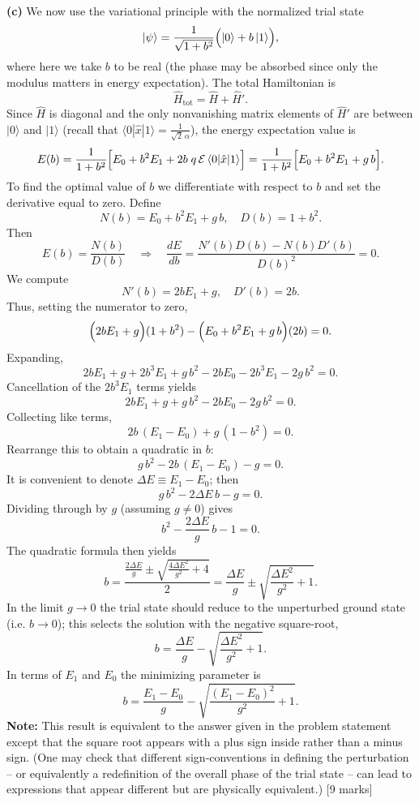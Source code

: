 \documentclass{article}
\begin{document}
\textbf{(c)} We now use the variational principle with the normalized trial state
\[
|\psi\rangle = \frac{1}{\sqrt{1+b^2}}\Bigl(|0\rangle + b\,|1\rangle\Bigr),
\]
where here we take \(b\) to be real (the phase may be absorbed since only the modulus matters in energy expectation). The total Hamiltonian is
\[
\hat{H}_{\text{tot}} = \hat{H} + \hat{H}'.
\]
Since \(\hat{H}\) is diagonal and the only nonvanishing matrix elements of \(\hat{H}'\) are between \(|0\rangle\) and \(|1\rangle\) (recall that
\(\langle 0|\hat{x}|1\rangle = \frac{1}{\sqrt{2}\,\alpha}\)),
the energy expectation value is
\[
E(b) = \frac{1}{1+b^2}\Bigl[E_0 + b^2 E_1 + 2b\;q\,\mathcal{E}\,\langle 0|\hat{x}|1\rangle\Bigr]
=\frac{1}{1+b^2}\Bigl[E_0 + b^2 E_1 + g\,b\Bigr].
\]
To find the optimal value of \(b\) we differentiate with respect to \(b\) and set the derivative equal to zero. Define
\[
N(b)= E_0 + b^2E_1+ g\,b,\quad D(b)=1+b^2.
\]
Then
\[
E(b)=\frac{N(b)}{D(b)}\quad\Longrightarrow\quad \frac{dE}{db} = \frac{N'(b)D(b)-N(b)D'(b)}{D(b)^2}=0.
\]
We compute
\[
N'(b)=2bE_1+ g,\quad D'(b)=2b.
\]
Thus, setting the numerator to zero,
\[
\Bigl(2bE_1+ g\Bigr)(1+b^2) - \Bigl(E_0+b^2E_1+ g\,b\Bigr)(2b)=0.
\]
Expanding,
\[
2bE_1+g + 2b^3E_1+ g\,b^2 - 2bE_0 - 2b^3E_1- 2g\,b^2=0.
\]
Cancellation of the \(2b^3E_1\) terms yields
\[
2bE_1 + g + g\,b^2 - 2bE_0 - 2g\,b^2 = 0.
\]
Collecting like terms,
\[
2b\,(E_1-E_0) + g\,(1 - b^2) = 0.
\]
Rearrange this to obtain a quadratic in \(b\):
\[
g\,b^2 - 2b\,(E_1-E_0) - g = 0.
\]
It is convenient to denote \(\Delta E \equiv E_1-E_0\); then
\[
g\,b^2 - 2\Delta E\, b - g = 0.
\]
Dividing through by \(g\) (assuming \(g\neq 0\)) gives
\[
b^2 - \frac{2\Delta E}{g}\, b - 1 = 0.
\]
The quadratic formula then yields
\[
b = \frac{\frac{2\Delta E}{g} \pm \sqrt{\frac{4\Delta E^2}{g^2}+4}}{2}
= \frac{\Delta E}{g} \pm \sqrt{\frac{\Delta E^2}{g^2}+1}.
\]
In the limit \(g\to0\) the trial state should reduce to the unperturbed ground state (i.e. \(b\to0\)); this selects the solution with the negative square-root,
\[
b = \frac{\Delta E}{g} - \sqrt{\frac{\Delta E^2}{g^2}+1}.
\]
In terms of \(E_1\) and \(E_0\) the minimizing parameter is
\[
b = \frac{E_1-E_0}{g} - \sqrt{\frac{(E_1-E_0)^2}{g^2}+1}.
\]
\textbf{Note:} This result is equivalent to the answer given in the problem statement except that the square root appears with a plus sign inside rather than a minus sign. (One may check that different sign‐conventions in defining the perturbation – or equivalently a redefinition of the overall phase of the trial state – can lead to expressions that appear different but are physically equivalent.) 
\hfill [9 marks]
\end{document}
